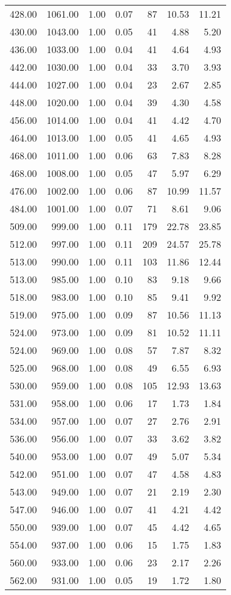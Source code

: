 \begin{table}
\begin{tabular}{rrrrrrr}
428.00 & 1061.00 & 1.00 & 0.07 & 87 & 10.53 & 11.21 \\
430.00 & 1043.00 & 1.00 & 0.05 & 41 & 4.88 & 5.20 \\
436.00 & 1033.00 & 1.00 & 0.04 & 41 & 4.64 & 4.93 \\
442.00 & 1030.00 & 1.00 & 0.04 & 33 & 3.70 & 3.93 \\
444.00 & 1027.00 & 1.00 & 0.04 & 23 & 2.67 & 2.85 \\
448.00 & 1020.00 & 1.00 & 0.04 & 39 & 4.30 & 4.58 \\
456.00 & 1014.00 & 1.00 & 0.04 & 41 & 4.42 & 4.70 \\
464.00 & 1013.00 & 1.00 & 0.05 & 41 & 4.65 & 4.93 \\
468.00 & 1011.00 & 1.00 & 0.06 & 63 & 7.83 & 8.28 \\
468.00 & 1008.00 & 1.00 & 0.05 & 47 & 5.97 & 6.29 \\
476.00 & 1002.00 & 1.00 & 0.06 & 87 & 10.99 & 11.57 \\
484.00 & 1001.00 & 1.00 & 0.07 & 71 & 8.61 & 9.06 \\
509.00 & 999.00 & 1.00 & 0.11 & 179 & 22.78 & 23.85 \\
512.00 & 997.00 & 1.00 & 0.11 & 209 & 24.57 & 25.78 \\
513.00 & 990.00 & 1.00 & 0.11 & 103 & 11.86 & 12.44 \\
513.00 & 985.00 & 1.00 & 0.10 & 83 & 9.18 & 9.66 \\
518.00 & 983.00 & 1.00 & 0.10 & 85 & 9.41 & 9.92 \\
519.00 & 975.00 & 1.00 & 0.09 & 87 & 10.56 & 11.13 \\
524.00 & 973.00 & 1.00 & 0.09 & 81 & 10.52 & 11.11 \\
524.00 & 969.00 & 1.00 & 0.08 & 57 & 7.87 & 8.32 \\
525.00 & 968.00 & 1.00 & 0.08 & 49 & 6.55 & 6.93 \\
530.00 & 959.00 & 1.00 & 0.08 & 105 & 12.93 & 13.63 \\
531.00 & 958.00 & 1.00 & 0.06 & 17 & 1.73 & 1.84 \\
534.00 & 957.00 & 1.00 & 0.07 & 27 & 2.76 & 2.91 \\
536.00 & 956.00 & 1.00 & 0.07 & 33 & 3.62 & 3.82 \\
540.00 & 953.00 & 1.00 & 0.07 & 49 & 5.07 & 5.34 \\
542.00 & 951.00 & 1.00 & 0.07 & 47 & 4.58 & 4.83 \\
543.00 & 949.00 & 1.00 & 0.07 & 21 & 2.19 & 2.30 \\
547.00 & 946.00 & 1.00 & 0.07 & 41 & 4.21 & 4.42 \\
550.00 & 939.00 & 1.00 & 0.07 & 45 & 4.42 & 4.65 \\
554.00 & 937.00 & 1.00 & 0.06 & 15 & 1.75 & 1.83 \\
560.00 & 933.00 & 1.00 & 0.06 & 23 & 2.17 & 2.26 \\
562.00 & 931.00 & 1.00 & 0.05 & 19 & 1.72 & 1.80 \\
\bottomrule
\end{tabular}
\end{table}
